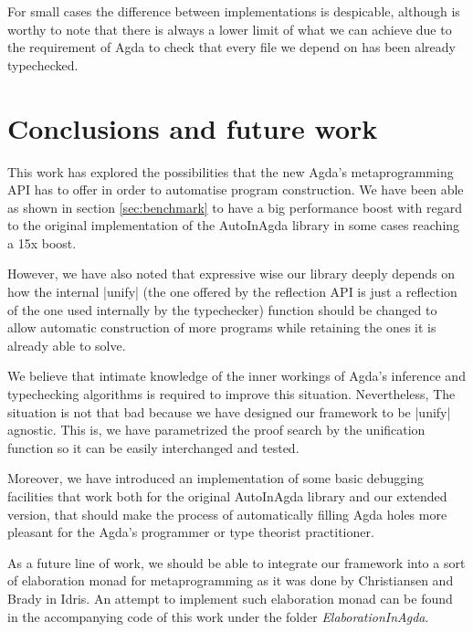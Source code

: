 \documentclass[a4paper]{article}
\begin{document}
For small cases the difference between implementations is
despicable, although is worthy to note that there is always a lower limit of
what we can achieve due to the requirement of Agda to check that every file we
depend on has been already typechecked.

\section{Conclusions and future work}
\label{sec:conclusions}

This work has explored the possibilities that the new Agda's metaprogramming API
has to offer in order to automatise program construction. We have been able as
shown in section \ref{sec:benchmark} to have a big performance boost with
regard to the original implementation of the AutoInAgda library in some cases
reaching a 15x boost.

However, we have also noted that expressive wise our library deeply depends on
how the internal |unify| (the one offered by the reflection API is just a
reflection of the one used internally by the typechecker) function should be
changed to allow automatic construction of more programs while retaining the
ones it is already able to solve.

We believe that intimate knowledge of the inner workings of Agda's inference and
typechecking algorithms is required to improve this situation. Nevertheless,
The situation is not that bad because we have designed our framework to be
|unify| agnostic. This is, we have parametrized the proof search by the
unification function so it can be easily interchanged and tested.

Moreover, we have introduced an implementation of some basic debugging
facilities that work both for the original AutoInAgda library and our extended
version, that should make the process of automatically filling Agda holes more
pleasant for the Agda's programmer or type theorist practitioner.

As a future line of work, we should be able to integrate our framework into a
sort of elaboration monad for metaprogramming as it was done by Christiansen and
Brady \cite{Christiansen:2016:ERE:2951913.2951932} in Idris. An attempt to
implement such elaboration monad can be found in the accompanying code of this
work under the folder \emph{ElaborationInAgda}.

\appendix



\end{document}
